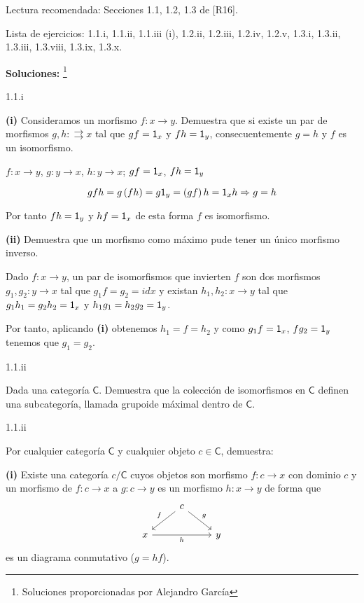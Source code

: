 Lectura recomendada: Secciones 1.1, 1.2, 1.3 de [R16].

Lista de ejercicios: 1.1.i, 1.1.ii, 1.1.iii (i), 1.2.ii, 1.2.iii, 1.2.iv, 1.2.v, 1.3.i, 1.3.ii, 1.3.iii, 1.3.viii, 1.3.ix, 1.3.x.

{\bf Soluciones: }\footnote{Soluciones proporcionadas por Alejandro García}

\begin{Ej}\label{ej:1.1.i}
   1.1.i


   {\bf (i)} Consideramos un morfismo $f \colon x \rightarrow y$. Demuestra que si existe un par de morfismos $g,h \colon \rightrightarrows x$ tal que $gf=\textup{\textsf{1}}_{x}$ y $fh=\textup{\textsf{1}}_{y}$,  consecuentemente $g=h$ y $f$ es un isomorfismo.

   $f \colon x \rightarrow y$, $g \colon y \rightarrow x$, $h \colon y \rightarrow x$; $gf=\textup{\textsf{1}}_{x}$, $fh=\textup{\textsf{1}}_{y}$ 

\begin{equation*}
gfh = g \left( fh\right) = g \textup{\textsf{1}}_{y} = \left(gf\right) h = \textup{\textsf{1}}_{x}h \Rightarrow g=h
\end{equation*}


  Por tanto $fh=\textup{\textsf{1}}_{y}$ y $hf=\textup{\textsf{1}}_{x}$ de esta forma $f$ es isomorfismo. 
  
  {\bf (ii)} Demuestra que un morfismo como máximo pude tener un único morfismo inverso.  

  Dado $f \colon x \rightarrow y$, un par de isomorfismos que invierten $f$ son dos morfismos $g_1,g_2 \colon y \rightarrow x $ tal que $g_1f=g_2=id{x}$ y existan $h_1,h_2 \colon x \rightarrow y$ tal que $g_1 h_1=g_2h_2=\textup{\textsf{1}}_{x}$ y $h_1g_1=h_2g_2=\textup{\textsf{1}}_{y}$. 

  Por tanto, aplicando {\bf (i)} obtenemos $h_1=f=h_2$ y como $g_1f=\textup{\textsf{1}}_{x}$, $fg_2=\textup{\textsf{1}}_{y}$ tenemos que $g_1=g_2$.



\end{Ej}


\begin{Ej}\label{ej:1.1.ii}
1.1.ii  

  Dada una categoría $\mathsf{C}$. Demuestra que la colección de isomorfismos en $\mathsf{C}$ definen una subcategoría, llamada grupoide máximal dentro de $\mathsf{C}$.


\end{Ej}



\begin{Ej}\label{ej:1.1.ii_i}
  1.1.ii 

  Por cualquier categoría $\mathsf{C}$ y cualquier objeto $c\in \mathsf{C}$, demuestra:

  {\bf (i)} Existe una categoría $c/\mathsf{C}$ cuyos objetos son morfismo $f \colon c \rightarrow x$ con dominio $c$ y un morfismo de $f\colon c \rightarrow x$ a $g\colon c \rightarrow y$ es un morfismo $h \colon x \rightarrow y$ de forma que 
\[
  \begin{tikzcd}
    & c \arrow[dl,"f"swap] \arrow[dr,"g"] \\
    x \arrow[rr,"h"swap] & & y
  \end{tikzcd}
\]
  es un diagrama conmutativo ($g=hf$).

\end{Ej}
